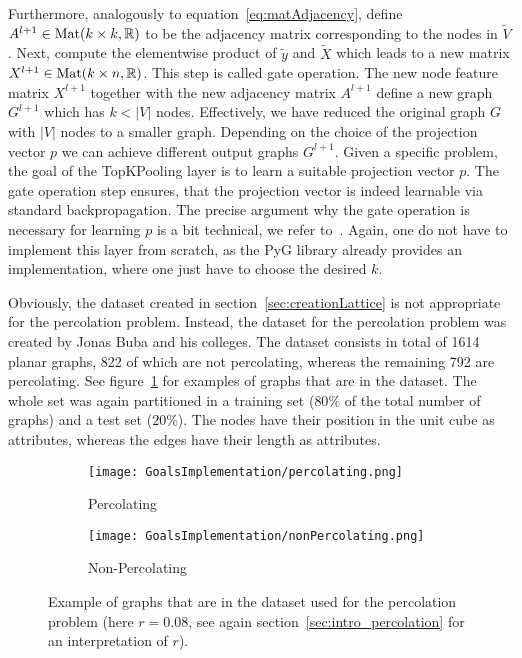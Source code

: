 Furthermore, analogously to equation~\ref{eq:matAdjacency}, define $A^{l+1}\in\text{Mat}(k\times k,\mathbb{R})$ 
to be the adjacency matrix corresponding to the nodes in $\tilde{V}$.
Next, compute the elementwise product of $\tilde{y}$ and $\tilde{X}$ which leads to a new matrix
$X^{l+1}\in\text{Mat}(k\times n,\mathbb{R})$. This step is called \glqq{}gate operation\grqq{}.
The new node feature matrix $X^{l+1}$ together with the new adjacency matrix $A^{l+1}$
define a new graph $G^{l+1}$ which has $k<|V|$ nodes. Effectively, we have reduced the original graph $G$ with
$|V|$ nodes to a smaller graph. Depending on the choice of the projection vector $p$ we can
achieve different output graphs $G^{l+1}$. Given a specific problem, the goal of the 
TopKPooling layer is to learn a suitable projection vector $p$.
The gate operation step ensures, that the projection vector is indeed learnable via standard backpropagation.
The precise argument why the gate operation is necessary for learning $p$ is a bit technical, we refer to~\cite{topKPooling}.
Again, one do not have to implement this layer from scratch, as the PyG library already provides an implementation, where one 
just have to choose the desired $k$.

Obviously, the dataset created in section~\ref{sec:creationLattice} is not appropriate
for the percolation problem. Instead, the dataset for the percolation problem was created by Jonas Buba and his 
colleges. The dataset consists in total of 1614 planar graphs, 822 of which are not percolating, whereas
the remaining 792 are percolating. See figure~\ref{fig:expPercNonPerc} for examples of graphs that are in the dataset.
The whole set was again partitioned in a training set ($80\%$ of the total number of graphs)
and a test set ($20\%$). The nodes have their position in the unit cube as attributes, whereas the edges have their length as attributes.
\begin{figure}[h]
    \centering
    \begin{subfigure}[t]{0.45\textwidth}
        \centering
        \texttt{[image: GoalsImplementation/percolating.png]}
        \caption{Percolating}
    \end{subfigure}
    \hfill
    \begin{subfigure}[t]{0.45\textwidth}
        \centering
        \texttt{[image: GoalsImplementation/nonPercolating.png]}
        \caption{Non-Percolating}
    \end{subfigure}
    \caption{Example of graphs that are in the dataset used for the percolation problem 
    (here $r=0.08$, see again section~\ref{sec:intro_percolation} for an interpretation of $r$).}
    \label{fig:expPercNonPerc}
\end{figure}